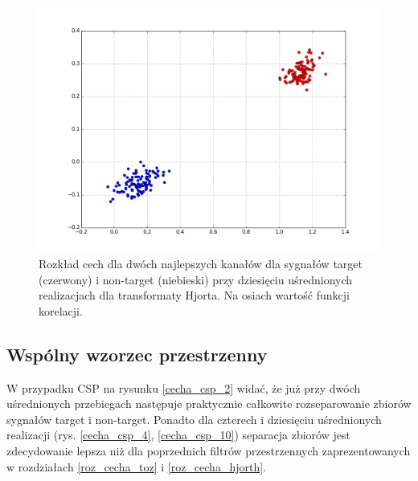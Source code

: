\documentclass[licencjacka,openright]{pracamgr}
\begin{document}
\begin{figure}
\centering
\includegraphics[scale=0.55, trim=10mm 15mm 10mm 18mm, clip=True]{pics/cecha_hjorth_10.png}
\caption{Rozkład cech dla dwóch najlepszych kanałów dla sygnałów target (czerwony) i non-target (niebieski) przy dziesięciu uśrednionych realizacjach dla transformaty Hjorta. Na osiach wartość funkcji korelacji.}
\label{cecha_hjorth_10}
\end{figure}

\subsection{Wspólny wzorzec przestrzenny}
\label{roz_cecha_csp}
W przypadku CSP na rysunku \ref{cecha_csp_2} widać, że już przy dwóch uśrednionych przebiegach następuje praktycznie całkowite rozseparowanie zbiorów sygnałów target i non-target. Ponadto dla czterech i dziesięciu uśrednionych realizacji (rys. \ref{cecha_csp_4}, \ref{cecha_csp_10}) separacja zbiorów jest zdecydowanie lepsza niż dla poprzednich filtrów przestrzennych zaprezentowanych w rozdziałach \ref{roz_cecha_toz} i \ref{roz_cecha_hjorth}.
\end{document}
